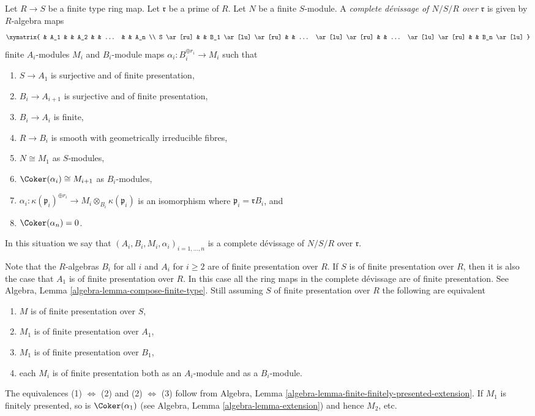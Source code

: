 \begin{definition}
\label{definition-complete-devissage-algebra}
Let $R \to S$ be a finite type ring map.
Let $\mathfrak r$ be a prime of $R$.
Let $N$ be a finite $S$-module.
A {\it complete d\'evissage of $N/S/R$ over $\mathfrak r$}
is given by $R$-algebra maps
$$
\xymatrix{
& A_1 & & A_2 & & ... & & A_n \\
S \ar[ru] & & B_1 \ar[lu] \ar[ru] & & ... \ar[lu] \ar[ru] & &
... \ar[lu] \ar[ru] & & B_n \ar[lu]
}
$$
finite $A_i$-modules $M_i$ and $B_i$-module maps
$\alpha_i : B_i^{\oplus r_i} \to M_i$ such that
\begin{enumerate}
\item $S \to A_1$ is surjective and of finite presentation,
\item $B_i \to A_{i + 1}$ is surjective and of finite presentation,
\item $B_i \to A_i$ is finite,
\item $R \to B_i$ is smooth with geometrically irreducible fibres,
\item $N \cong M_1$ as $S$-modules,
\item $\Coker(\alpha_i) \cong M_{i + 1}$ as $B_i$-modules,
\item $\alpha_i : \kappa(\mathfrak p_i)^{\oplus r_i}
\to M_i \otimes_{B_i} \kappa(\mathfrak p_i)$ is an isomorphism
where $\mathfrak p_i = \mathfrak rB_i$, and
\item $\Coker(\alpha_n) = 0$.
\end{enumerate}
In this situation we say that
$(A_i, B_i, M_i, \alpha_i)_{i = 1, \ldots, n}$
is a complete d\'evissage of $N/S/R$ over $\mathfrak r$.
\end{definition}

\begin{remark}
\label{remark-finite-presentation}
Note that the $R$-algebras $B_i$ for all $i$ and $A_i$ for $i \geq 2$
are of finite presentation over $R$. If $S$ is of finite presentation over
$R$, then it is also the case that $A_1$ is of finite presentation over
$R$. In this case all the ring maps in the complete d\'evissage are of
finite presentation. See
Algebra, Lemma \ref{algebra-lemma-compose-finite-type}.
Still assuming $S$ of finite presentation over $R$
the following are equivalent
\begin{enumerate}
\item $M$ is of finite presentation over $S$,
\item $M_1$ is of finite presentation over $A_1$,
\item $M_1$ is of finite presentation over $B_1$,
\item each $M_i$ is of finite presentation both as an $A_i$-module
and as a $B_i$-module.
\end{enumerate}
The equivalences (1) $\Leftrightarrow$ (2) and (2) $\Leftrightarrow$ (3)
follow from
Algebra, Lemma \ref{algebra-lemma-finite-finitely-presented-extension}.
If $M_1$ is finitely presented, so is $\Coker(\alpha_1)$ (see
Algebra, Lemma \ref{algebra-lemma-extension})
and hence $M_2$, etc.
\end{remark}

